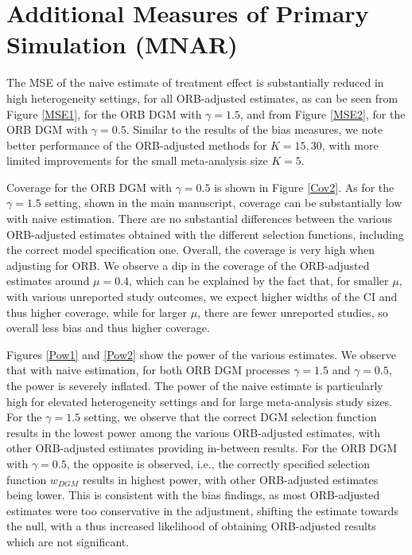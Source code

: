 \documentclass{article}\usepackage[]{graphicx}\usepackage[]{xcolor}
\begin{document}

\section{Additional Measures of Primary Simulation (MNAR)}

The MSE of the naive estimate of treatment effect is substantially reduced in high heterogeneity settings, for all ORB-adjusted estimates, as can be seen from Figure \ref{MSE1}, for the ORB DGM with $\gamma=1.5$, and from Figure \ref{MSE2}, for the ORB DGM with $\gamma=0.5$. Similar to the results of the bias measures, we note better performance of the ORB-adjusted methods for $K=15,30$, with more limited improvements for the small meta-analysis size $K=5$. 

\bigskip

Coverage for the ORB DGM with $\gamma=0.5$ is shown in Figure \ref{Cov2}. As for the $\gamma=1.5$ setting, shown in the main manuscript, coverage can be substantially low with naive estimation. There are no substantial differences between the various ORB-adjusted estimates obtained with the different selection functions, including the correct model specification one. Overall, the coverage is very high when adjusting for ORB. We observe a dip in the coverage of the ORB-adjusted estimates around $\mu=0.4$, which can be explained by the fact that, for smaller $\mu$, with various unreported study outcomes, we expect higher widths of the CI and thus higher coverage, while for larger $\mu$, there are fewer unreported studies, so overall less bias and thus higher coverage.

\bigskip

Figures \ref{Pow1} and \ref{Pow2} show the power of the various estimates. We observe that with naive estimation, for both ORB DGM processes $\gamma=1.5$ and $\gamma=0.5$, the power is severely inflated. The power of the naive estimate is particularly high for elevated heterogeneity settings and for large meta-analysis study sizes. For the $\gamma=1.5$ setting, we observe that the correct DGM selection function results in the lowest power among the various ORB-adjusted estimates, with other ORB-adjusted estimates providing in-between results. For the ORB DGM with $\gamma=0.5$, the opposite is observed, i.e., the correctly specified selection function $w_{DGM}$ results in highest power, with other ORB-adjusted estimates being lower. This is consistent with the bias findings, as most ORB-adjusted estimates were too conservative in the adjustment, shifting the estimate towards the null, with a thus increased likelihood of obtaining ORB-adjusted results which are not significant.
\end{document}
